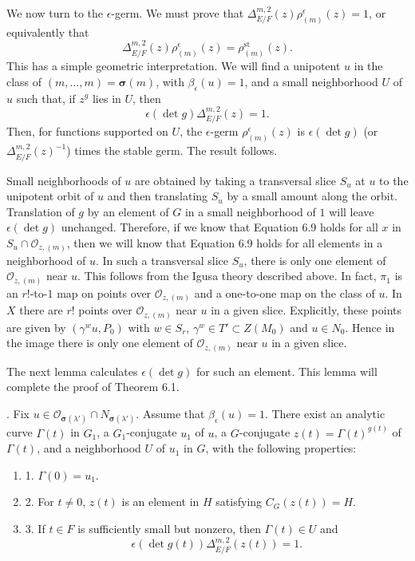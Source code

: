\documentclass{amsart}
\begin{document}
We now turn to the $\epsilon$-germ.
We must prove that $\Delta^{m,2}_{E/F}(z)\rho^\epsilon_{(m)}(z) = 1$, or equivalently that
$$\Delta^{m,2}_{E/F}(z)\rho^\epsilon_{(m)}(z) = \rho^{\text{st}}_{(m)}(z).$$
This has a simple geometric interpretation.  We will find a unipotent $u$
in the class of $(m,\ldots,m)=\pmb\sigma(m)$, with $\beta_\epsilon(u) = 1$, and a small
neighborhood $U$ of $u$ such that, if $z^g$ lies in $U$, then
\begin{equation}\label{eqn:6.9}
\epsilon(\det g)\Delta^{m,2}_{E/F}(z) = 1.%
\end{equation}
Then, for functions supported on $U$, the $\epsilon$-germ $\rho^\epsilon_{(m)}(z)$
is $\epsilon(\det g)$ (or $\Delta^{m,2}_{E/F}(z)^{-1}$) times the stable germ.
The result follows.

Small neighborhoods of $u$ are obtained by taking a transversal slice $S_u$
at $u$ to the unipotent orbit of $u$ and then translating $S_u$ by a small
amount along the orbit.
Translation of $g$ by an element of $G$ in a small neighborhood
of $1$ will leave $\epsilon(\det g)$ unchanged.
Therefore, if we know that Equation 6.9 holds for all $x$ in $S_u\cap {\mathcal O}_{z,(m)}$,
then we will know that Equation 6.9 holds for all elements
in a neighborhood of $u$.  In such a transversal slice $S_u$, there is only
one element of ${\mathcal O}_{z,(m)}$ near $u$.  This follows from the
Igusa theory described above.  In fact, $\pi_1$ is an $r!$-to-$1$ map on 
points over ${\mathcal O}_{z,(m)}$
and a one-to-one map on the class of $u$.  In $X$ there are $r!$ points
 over ${\mathcal O}_{z,(m)}$ near $u$
in a given slice.
Explicitly, these points are given by
$(\gamma^wu,P_0)$ with $w\in S_r$, $\gamma^w\in T'\subset Z(M_0)$ and $u\in N_0$.
Hence in the image there is only one element of ${\mathcal O}_{z,(m)}$
near $u$ in a given slice.

The next lemma calculates $\epsilon(\det g)$ for such an element.  This lemma
will complete the proof of Theorem 6.1.


.  Fix $u\in {\mathcal O_{\pmb\sigma(\lambda')}}\cap 
N_{\pmb\sigma(\lambda')}$.  Assume that $\beta_\epsilon(u) = 1$.
There exist an analytic curve $\Gamma(t)$ in $G_1$, a $G_1$-conjugate
$u_1$ of $u$, a $G$-conjugate $z(t)= \Gamma(t)^{g(t)}$ of $\Gamma(t)$, and a
neighborhood $U$ of $u_1$ in $G$,
with the following properties:
\begin{enumerate}
\item{1.}  $\Gamma(0) =u_1$.
\item{2.}  For $t\ne 0$, $z(t)$ is an element in $H$ satisfying
                  $C_G(z(t)) = H$.
\item{3.}  If $t\in F$ is sufficiently small but nonzero,
       then $\Gamma(t)\in U$ and 
       $$\epsilon(\det g(t))\Delta^{m,2}_{E/F}(z(t))=1.$$
\end{enumerate}
\finishproclaim
\end{document}
